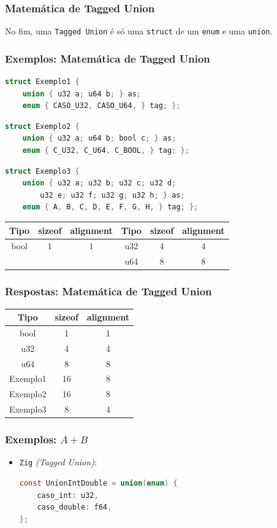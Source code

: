 \documentclass{beamer}
\newcommand{\lang}[1]{\texttt{#1}}
\newcommand{\inlcode}[1]{\texttt{#1}}
\newcommand{\tabelasizealignTwo}{%
    \begin{tabular}{|c|c|c||c|c|c|}%
        \hline%
        Tipo & sizeof & alignment &%
        Tipo & sizeof & alignment \\\hline%
        \hline%
        bool & 1      & 1         &%
        u32  & 4      & 4         \\\hline&&&%
        u64  & 8      & 8         \\\hline%
    \end{tabular}%
}
\begin{document}
\begin{frame}
    \frametitle{Matemática de Tagged Union}
    No fim, uma \inlcode{Tagged Union} é só
    uma \inlcode{struct} de
    um \inlcode{enum} e uma \inlcode{union}.
\end{frame}

\begin{frame}[fragile]
    \frametitle{Exemplos: Matemática de Tagged Union}
    \begin{lstlisting}[language=C]
struct Exemplo1 {
    union { u32 a; u64 b; } as;
    enum { CASO_U32, CASO_U64, } tag; };
    \end{lstlisting}
    \begin{lstlisting}[language=C]
struct Exemplo2 {
    union { u32 a; u64 b; bool c; } as;
    enum { C_U32, C_U64, C_BOOL, } tag; };
    \end{lstlisting}
    \begin{lstlisting}[language=C]
struct Exemplo3 {
    union { u32 a; u32 b; u32 c; u32 d;
        u32 e; u32 f; u32 g; u32 h; } as;
    enum { A, B, C, D, E, F, G, H, } tag; };
    \end{lstlisting}
    \tabelasizealignTwo{}
\end{frame}

\begin{frame}
    \frametitle{Respostas: Matemática de Tagged Union}
    \begin{center} \begin{tabular}{|c|c|c|}
        \hline%
        Tipo      & sizeof & alignment \\\hline
        \hline
        bool      & 1      & 1         \\\hline
        u32       & 4      & 4         \\\hline
        u64       & 8      & 8         \\\hline
        \hline
        Exemplo1  & 16     & 8         \\\hline
        Exemplo2  & 16     & 8         \\\hline
        Exemplo3  & 8      & 4         \\\hline
    \end{tabular} \end{center}
\end{frame}

\begin{frame}[fragile]
    \frametitle{Exemplos: \(A + B\)}
    \begin{itemize}
        \item \lang{Zig} \emph{(Tagged Union)}:
            \begin{lstlisting}[language=C]
const UnionIntDouble = union(enum) {
    caso_int: u32,
    caso_double: f64,
};
            \end{lstlisting}
    \end{itemize}
\end{frame}
\end{document}
